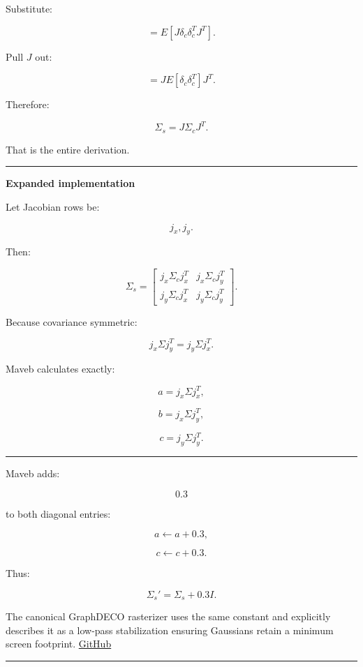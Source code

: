 Substitute:

\[
=
E[
J\delta_c
\delta_c^T
J^T
].
\]

Pull \(J\) out:

\[
=
J
E[
\delta_c\delta_c^T
]
J^T.
\]

Therefore:

\[
\boxed{
\Sigma_s=
J\Sigma_cJ^T.
}
\]

That is the entire derivation.

\begin{center}\rule{0.5\linewidth}{0.5pt}\end{center}

\textbf{Expanded implementation}

Let Jacobian rows be:

\[
j_x,
j_y.
\]

Then:

\[
\Sigma_s=
\begin{bmatrix}
j_x\Sigma_cj_x^T
&
j_x\Sigma_cj_y^T
\\
j_y\Sigma_cj_x^T
&
j_y\Sigma_cj_y^T
\end{bmatrix}.
\]

Because covariance symmetric:

\[
j_x\Sigma j_y^T
=
j_y\Sigma j_x^T.
\]

Maveb calculates exactly:

\[
a=j_x\Sigma j_x^T,
\]

\[
b=j_x\Sigma j_y^T,
\]

\[
c=j_y\Sigma j_y^T.
\]

\begin{center}\rule{0.5\linewidth}{0.5pt}\end{center}

Maveb adds:

\[
0.3
\]

to both diagonal entries:

\[
a\leftarrow a+0.3,
\]

\[
c\leftarrow c+0.3.
\]

Thus:

\[
\boxed{
\Sigma_s'
=
\Sigma_s
+
0.3I.
}
\]

The canonical GraphDECO rasterizer uses the same constant and explicitly describes it as a low-pass stabilization ensuring Gaussians retain a minimum screen footprint. \href{https://github.com/graphdeco-inria/diff-gaussian-rasterization/blob/main/cuda_rasterizer/forward.cu?utm_source=chatgpt.com}{GitHub}

\begin{center}\rule{0.5\linewidth}{0.5pt}\end{center}

